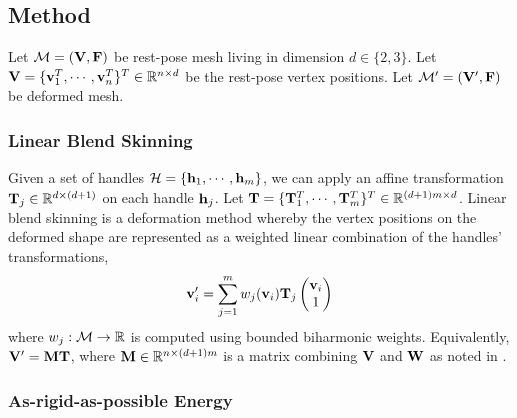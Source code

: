 \subsection*{Method}

Let $\mathcal{M} = (\mathbf{V}, \mathbf{F})$ be rest-pose mesh living in dimension $d\in\{2,3\}$. Let $\mathbf{V} = \{\mathbf{v}_1^T, \cdots, \mathbf{v}_n^T\}^T \in \mathbb{R}^{n \times d}$ be the rest-pose vertex positions. Let $\mathcal{M}' = (\mathbf{V}', \mathbf{F})$ be deformed mesh.

\subsubsection*{Linear Blend Skinning}

Given a set of handles $\mathcal{H} = \{ \mathbf{h}_1, \cdots, \mathbf{h}_m \}$, we can apply an affine transformation $\mathbf{T}_j \in \mathbb{R}^{d \times (d+1)}$ on each handle $\mathbf{h}_j$. Let $\mathbf{T} = \{ \mathbf{T}_1^T, \cdots, \mathbf{T}_m^T \}^T \in \mathbb{R}^{(d+1)m \times d}$. Linear blend skinning is a deformation method whereby the vertex positions on the deformed shape are represented as a weighted linear combination of the handles' transformations,
\[
    \mathbf{v}_i' = \sum_{j=1}^m w_j(\mathbf{v}_i) \mathbf{T}_j 
    \begin{pmatrix} 
    \mathbf{v}_i \\
    1 
    \end{pmatrix} 
\]
where $w_j: \mathcal{M} \rightarrow \mathbb{R}$ is computed using bounded biharmonic weights.\cite{jacobson_bounded_biharmonic_weights_2011} Equivalently, $\mathbf{V}' = \mathbf{M} \mathbf{T}$, where $\mathbf{M} \in \mathbb{R}^{n \times (d+1)m}$ is a matrix combining $\mathbf{V}$ and $\mathbf{W}$ as noted in \cite{jacobson_fast_2012}. 





\subsubsection*{As-rigid-as-possible Energy}

